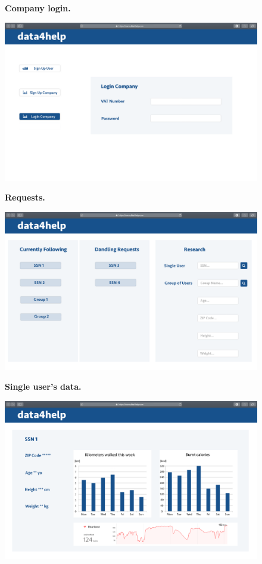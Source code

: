 \documentclass{article}
\begin{document}
\begin{figure}[h!]
\centering
    \textbf{Company login.}\par\medskip
	\includegraphics[width= \linewidth]{4logincompany.png}
\end{figure}\newpage
\begin{figure}[h!]
\centering
    \textbf{Requests.}\par\medskip
	\includegraphics[width= \linewidth]{5companyhompage.png}
\end{figure}
\begin{figure}[h!]
\centering
    \textbf{Single user's data.}\par\medskip
	\includegraphics[width= \linewidth]{6userprofile.png}
\end{figure}\newpage
\end{document}
